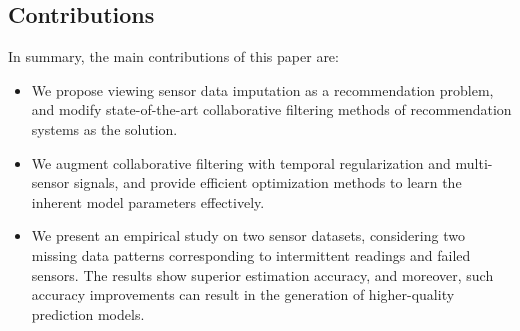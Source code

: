 \subsection{Contributions}

In summary, the main contributions of this paper are:
\begin{itemize}
\item We propose viewing sensor data imputation as a recommendation problem, and modify state-of-the-art collaborative filtering methods of recommendation systems as the solution. 
\item We augment collaborative filtering with temporal regularization and multi-sensor signals, and provide efficient optimization methods to learn the inherent model parameters effectively.
\item We present an empirical study on two sensor datasets, considering two
missing data patterns corresponding to intermittent readings and failed
sensors. The results show 
superior estimation accuracy,
and moreover, such accuracy improvements can result in the
generation of higher-quality prediction models.
\end{itemize}



